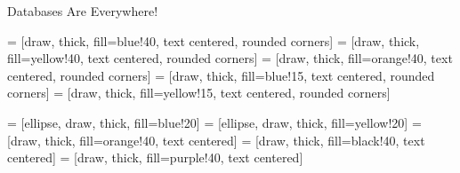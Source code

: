 \begin{frame}[t]{Databases Are Everywhere!}

  \hspace*{-.5in}
  \begin{minipage}{5in}
  \begin{center}

    \begin{minipage}{4.5in}

     = [draw, thick, fill=blue!40, text centered, rounded corners]
     = [draw, thick, fill=yellow!40, text centered, rounded corners]
     = [draw, thick, fill=orange!40, text centered, rounded corners]
     = [draw, thick, fill=blue!15, text centered, rounded corners]
     = [draw, thick, fill=yellow!15, text centered, rounded corners]

     = [ellipse, draw, thick, fill=blue!20]
     = [ellipse, draw, thick, fill=yellow!20]
     = [draw, thick, fill=orange!40, text centered]  
     = [draw, thick, fill=black!40, text centered]
     = [draw, thick, fill=purple!40, text centered]    

    

    



    \begin{figure}

    \begin{center}

\end{center}
\end{figure}
\end{minipage}
\end{center}
\end{minipage}
\end{frame}
